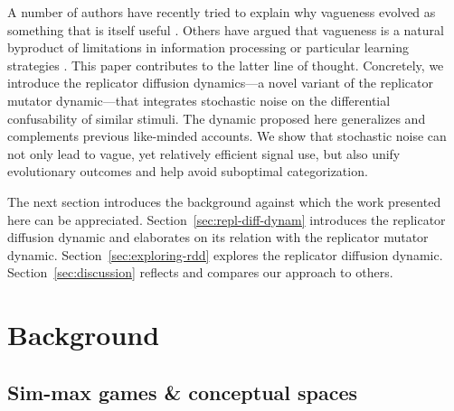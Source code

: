 \documentclass[fleqn,reqno,10pt]{article}
\begin{document}
A number of authors have recently tried to explain why vagueness
evolved as something that is itself useful
\citep[e.g.][]{Jaegherde-Jaegher2003:A-Game-Theoreti,Deemter2009:Utility-and-Lan,BlumeBoard2013:Intentional-Vag}.
Others have argued that vagueness is a natural byproduct of
limitations in information processing or particular learning
strategies
\citep[e.g.][]{FrankeJager2010:Vagueness-Signa,OConnor2013:The-Evolution-o}. This
paper contributes to the latter line of thought. Concretely, we
introduce the replicator diffusion dynamics---a novel variant of the
replicator mutator dynamic---that integrates stochastic noise on the
differential confusability of similar stimuli. The dynamic proposed
here generalizes and complements previous like-minded accounts. We
show that stochastic noise can not only lead to vague, yet relatively
efficient signal use, but also unify evolutionary outcomes and
help avoid suboptimal categorization.

The next section introduces the background against which the work
presented here can be appreciated. Section~\ref{sec:repl-diff-dynam}
introduces the replicator diffusion dynamic and elaborates on its
relation with the replicator mutator
dynamic. Section~\ref{sec:exploring-rdd} explores the replicator
diffusion dynamic. Section~\ref{sec:discussion} reflects and compares
our approach to others.

\section{Background}
\label{sec:background}


\subsection{Sim-max games \& conceptual spaces}
\end{document}
